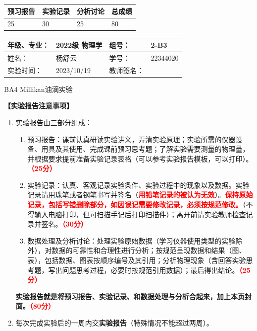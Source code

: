 \documentclass[dvipsnames, svgnames,a4paper,11pt]{article}
\begin{document}
	
	
	
	\begin{table}
		\renewcommand\arraystretch{1.7}
		\begin{tabularx}{\textwidth}{
				|X|X|X|X
				|X|X|X|X|}
			\hline
			\multicolumn{2}{|c|}{预习报告}&\multicolumn{2}{|c|}{实验记录}&\multicolumn{2}{|c|}{分析讨论}&\multicolumn{2}{|c|}{总成绩}\\
			\hline
			\LARGE25 & & \LARGE30 & & \LARGE25 & & \LARGE80 & \\
			\hline
		\end{tabularx}
	\end{table}
	
	\begin{table}
		\renewcommand\arraystretch{1.7}
		\begin{tabularx}{\textwidth}{|X|X|X|X|}
			\hline
			年级、专业： & 2022级 物理学 &组号： & 2-B3\\
			\hline
			姓名： & 杨舒云  & 学号： & 22344020\\
			\hline
			实验时间： & 2023/10/19 & 教师签名： & \\
			\hline
		\end{tabularx}
	\end{table}
	
	\begin{center}
		\LARGE BA4 \quad Millikan油滴实验
	\end{center}
	
	\textbf{【实验报告注意事项】}
	\begin{enumerate}
		\item 实验报告由三部分组成：
		\begin{enumerate}
			\item 预习报告：课前认真研读实验讲义，弄清实验原理；实验所需的仪器设备、用具及其使用、完成课前预习思考题；了解实验需要测量的物理量，并根据要求提前准备实验记录表格（可以参考实验报告模板，可以打印）。\textcolor{red}{\textbf{（25分）}}
			\item 实验记录：认真、客观记录实验条件、实验过程中的现象以及数据。实验记录请用珠笔或者钢笔书写并签名（\textcolor{red}{\textbf{用铅笔记录的被认为无效}}）。\textcolor{red}{\textbf{保持原始记录，包括写错删除部分，如因误记需要修改记录，必须按规范修改。}}（不得输入电脑打印，但可扫描手记后打印扫描件）；离开前请实验教师检查记录并签名。\textcolor{red}{\textbf{（30分）}}
			\item 数据处理及分析讨论：处理实验原始数据（学习仪器使用类型的实验除外），对数据的可靠性和合理性进行分析；按规范呈现数据和结果（图、表），包括数据、图表按顺序编号及其引用；分析物理现象（含回答实验思考题，写出问题思考过程，必要时按规范引用数据）；最后得出结论。\textcolor{red}{\textbf{（25分）}}
		\end{enumerate}
		\textbf{实验报告就是将预习报告、实验记录、和数据处理与分析合起来，加上本页封面。\textcolor{red}{（80分）}}
		\item 每次完成实验后的一周内交\textbf{实验报告}（特殊情况不能超过两周）。
	\end{enumerate}
	
\end{document}
